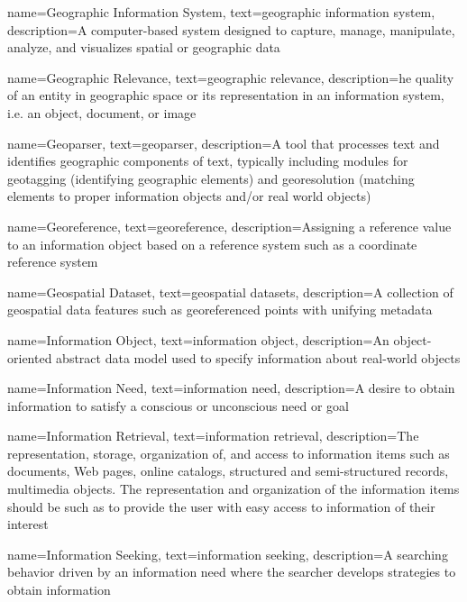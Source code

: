 {
    name=Geographic Information System,
    text=geographic information system,
    description={A computer-based system designed to capture, manage, manipulate, analyze, and visualizes spatial or geographic data}
}

{
    name=Geographic Relevance,
    text=geographic relevance,
    description={he quality of an entity in geographic space or its representation in an information system, i.e. an object, document, or image \cite{Reichenbacher2011}}
}

{
    name=Geoparser,
    text=geoparser,
    description={A tool that processes text and identifies geographic components of text, typically including modules for geotagging (identifying geographic elements) and georesolution (matching elements to proper information objects and/or real world objects)}
}

{
    name=Georeference,
    text=georeference,
    description=Assigning a reference value to an information object based on a reference system such as a coordinate reference system
}

{
    name=Geospatial Dataset,
    text=geospatial datasets,
    description=A collection of geospatial data features such as georeferenced points with unifying metadata
}

{
    name=Information Object,
    text=information object,
    description=An object-oriented abstract data model used to specify information about real-world objects
}

{
    name=Information Need,
    text=information need,
    description=A desire to obtain information to satisfy a conscious or unconscious need or goal
}

{
    name=Information Retrieval,
    text=information retrieval,
    description={The representation, storage, organization of, and access to information items such as documents, Web pages, online catalogs, structured and semi-structured records, multimedia objects. The representation and organization of the information items should be such as to provide the user with easy access to information of their interest \cite{Baeza-Yates1999}}
}

{
    name=Information Seeking,
    text=information seeking,
    description=A searching behavior driven by an information need where the searcher develops strategies to obtain information
}

